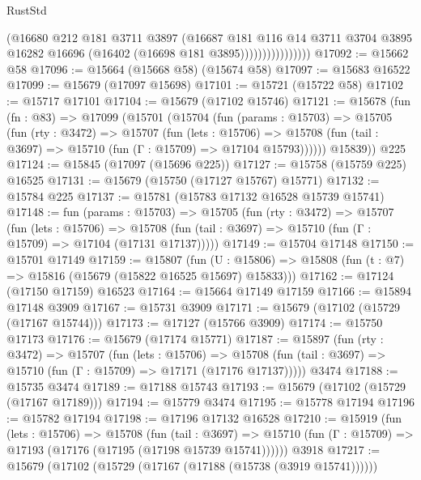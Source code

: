 \begin{lexlean}{RustStd}
\begin{coremodule}
{\begin{coremodule}
{{{{{{{{{{{{{{{{{{{{{{{{{{{{{{{{{{{{{{{{{{{{{{{                            (@16680
                              @212
                              @181
                              @3711
                              @3897
                              (@16687
                                @181
                                @116
                                @14
                                @3711
                                @3704
                                @3895
                                @16282
                                @16696
                                (@16402 (@16698 @181 @3895))))))))))))))))
@17092 := @15662 @58
@17096 := @15664 (@15668 @58) (@15674 @58)
@17097 := @15683 @16522
@17099 := @15679 (@17097 @15698)
@17101 := @15721 (@15722 @58)
@17102 := @15717 @17101
@17104 := @15679 (@17102 @15746)
@17121 := @15678
    (fun (fn : @83) =>
    @17099
      (@15701
        (@15704
          (fun (params : @15703) =>
          @15705
            (fun (rty : @3472) =>
            @15707
              (fun (lets : @15706) =>
              @15708 (fun (tail : @3697) => @15710 (fun (Γ : @15709) => @17104 @15793))))))
        @15839))
    @225
@17124 := @15845 (@17097 (@15696 @225))
@17127 := @15758 (@15759 @225) @16525
@17131 := @15679 (@15750 (@17127 @15767) @15771)
@17132 := @15784 @225
@17137 := @15781 (@15783 @17132 @16528 @15739 @15741)
@17148 := fun (params : @15703) =>
  @15705
    (fun (rty : @3472) =>
    @15707
      (fun (lets : @15706) =>
      @15708 (fun (tail : @3697) => @15710 (fun (Γ : @15709) => @17104 (@17131 @17137)))))
@17149 := @15704 @17148
@17150 := @15701 @17149
@17159 := @15807
    (fun (U : @15806) => @15808 (fun (t : @7) => @15816 (@15679 (@15822 @16525 @15697) @15833)))
@17162 := @17124 (@17150 @17159) @16523
@17164 := @15664 @17149 @17159
@17166 := @15894 @17148 @3909
@17167 := @15731 @3909
@17171 := @15679 (@17102 (@15729 (@17167 @15744)))
@17173 := @17127 (@15766 @3909)
@17174 := @15750 @17173
@17176 := @15679 (@17174 @15771)
@17187 := @15897
    (fun (rty : @3472) =>
    @15707
      (fun (lets : @15706) =>
      @15708 (fun (tail : @3697) => @15710 (fun (Γ : @15709) => @17171 (@17176 @17137)))))
    @3474
@17188 := @15735 @3474
@17189 := @17188 @15743
@17193 := @15679 (@17102 (@15729 (@17167 @17189)))
@17194 := @15779 @3474
@17195 := @15778 @17194
@17196 := @15782 @17194
@17198 := @17196 @17132 @16528
@17210 := @15919
    (fun (lets : @15706) =>
    @15708
      (fun (tail : @3697) =>
      @15710 (fun (Γ : @15709) => @17193 (@17176 (@17195 (@17198 @15739 @15741))))))
    @3918
@17217 := @15679 (@17102 (@15729 (@17167 (@17188 (@15738 (@3919 @15741))))))
}}}}}}}}}}}}}}}}}}}}}}}}}}}}}}}}}}}}}}}}}}}}}}}
\end{coremodule}}
\end{coremodule}
\end{lexlean}
